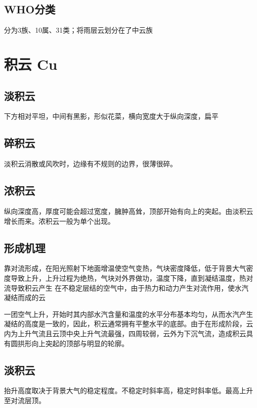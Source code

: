 \documentclass[UTF8,11pt]{ctexbook}
\begin{document}
\subsection{WHO分类}

分为3族、10属、31类；将雨层云划分在了中云族

\section{积云 Cu}

\subsection{淡积云}

下方相对平坦，中间有黑影，形似花菜，横向宽度大于纵向深度，扁平

\subsection{碎积云}

淡积云消散或风吹时，边缘有不规则的边界，很薄很碎。

\subsection{浓积云}

纵向深度高，厚度可能会超过宽度，臃肿高耸，顶部开始有向上的突起。由淡积云增长而来。浓积云一般为单个出现。

\subsection{形成机理}

靠对流形成，在阳光照射下地面增温使空气变热，气块密度降低，低于背景大气密度导致上升，上升过程为绝热，气块对外界做功，温度下降，直到凝结温度，热对流导致积云产生 在不稳定层结的空气中，由于热力和动力产生对流作用，使水汽凝结而成的云

一团空气上升，开始时其内部水汽含量和温度的水平分布基本均匀，从而水汽产生凝结的高度是一致的，因此，积云通常拥有平整水平的底部。由于在形成阶段，云内为上升气流且云顶中央上升气流最强，四周较弱，云外为下沉气流，造成积云具有圆拱形向上突起的顶部与明显的轮廓。

\subsection{淡积云}

抬升高度取决于背景大气的稳定程度。不稳定时斜率高，稳定时斜率低。最高上升至对流层顶。
\end{document}
